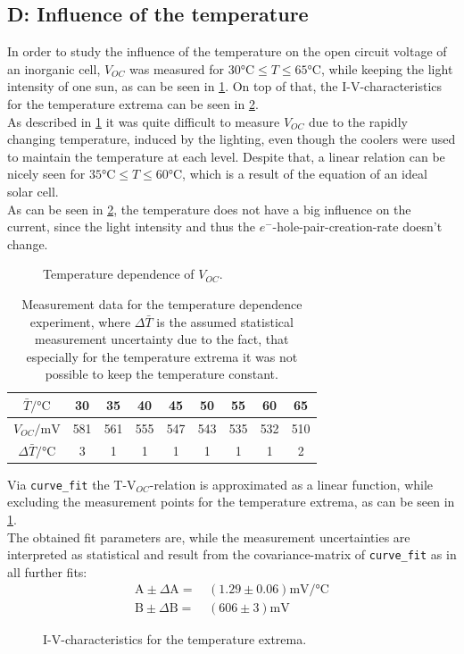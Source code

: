 \documentclass[english,  %
parskip=full,  %
headsepline]{scrartcl}
\begin{document}
\subsection{D: Influence of the temperature}
In order to study the influence of the temperature on the open circuit voltage of an inorganic cell, $V_{OC}$ was measured for $ 30\si{\celsius}\le T \le 65\si{\celsius}$, while keeping the light intensity of one sun, as can be seen in \cref{fig:D1}. On top of that, the I-V-characteristics for the temperature extrema can be seen in \cref{fig:D2}.\\
As described in \cref{tab:D} it was quite difficult to measure $V_{OC}$ due to the rapidly changing temperature, induced by the lighting, even though the coolers were used to maintain the temperature at each level. Despite that, a linear relation can be nicely seen for $35 \si{\celsius}\le T \le 60\si{\celsius}$, which is a result of the equation of an ideal solar cell.\\
As can be seen in \cref{fig:D2}, the temperature does not have a big influence on the current, since the light intensity and thus the $e^-$-hole-pair-creation-rate doesn't change. 
\begin{figure}[H]
    \centering
    
    \caption{Temperature dependence of $V_{OC}$.}
    \label{fig:D1}
\end{figure}
\begin{table}[H]
    \centering
    \caption{Measurement data for the temperature dependence experiment, where $\Delta \bar{T}$ is the assumed statistical measurement uncertainty due to the fact, that especially for the temperature extrema it was not possible to keep the temperature constant.}
    \begin{tabular}{c|c|c|c|c|c|c|c|c}
         $\bar{T} / \si{\celsius}$&30&35&40&45&50&55&60&65 \\ \hline
         $V_{OC} / \si{\milli\volt}$& 581&561&555&547&543&535&532&510 \\ \hline
         $\Delta \bar{T} / \si{\celsius}$&3&1&1&1&1&1&1&2
    \end{tabular}
    \label{tab:D}
\end{table}
Via \verb+curve_fit+ the T-V$_{OC}$-relation is approximated as a linear function, while excluding the measurement points for the temperature extrema, as can be seen in \cref{fig:D1}.\\
The obtained fit parameters are, while the measurement uncertainties are interpreted as statistical and result from the covariance-matrix of \verb+curve_fit+ as in all further fits:
\begin{align*}
\text{A} \pm \Delta \text{A}=&\,(1.29\pm0.06)\si{\milli\volt\per\celsius}\\
\text{B} \pm \Delta \text{B}=&\,(606\pm3)\si{\milli \volt}
\end{align*}
\begin{figure}[H]
    \centering
    
    \caption{I-V-characteristics for the temperature extrema.}
    \label{fig:D2}
\end{figure}
\end{document}
